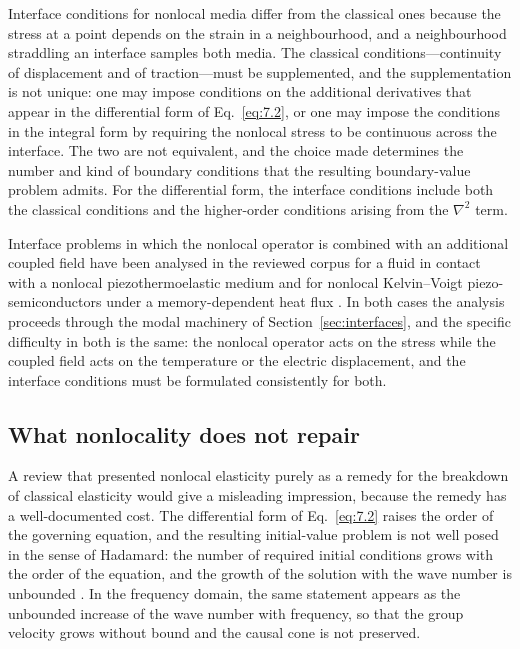 Interface conditions for nonlocal media differ from the classical ones because the stress at a point depends on the strain in a neighbourhood, and a neighbourhood straddling an interface samples both media. The classical conditions---continuity of displacement and of traction---must be supplemented, and the supplementation is not unique: one may impose conditions on the additional derivatives that appear in the differential form of Eq.~\eqref{eq:7.2}, or one may impose the conditions in the integral form by requiring the nonlocal stress to be continuous across the interface. The two are not equivalent, and the choice made determines the number and kind of boundary conditions that the resulting boundary-value problem admits. For the differential form, the interface conditions include both the classical conditions and the higher-order conditions arising from the $\nabla^2$ term.

Interface problems in which the nonlocal operator is combined with an additional coupled field have been analysed in the reviewed corpus for a fluid in contact with a nonlocal piezothermoelastic medium \cite{Gupta2023IJNMF} and for nonlocal Kelvin--Voigt piezo-semiconductors under a memory-dependent heat flux \cite{Gupta2026HeatMap}. In both cases the analysis proceeds through the modal machinery of Section~\ref{sec:interfaces}, and the specific difficulty in both is the same: the nonlocal operator acts on the stress while the coupled field acts on the temperature or the electric displacement, and the interface conditions must be formulated consistently for both.

\subsection{What nonlocality does not repair}
\label{sec:7.6}

A review that presented nonlocal elasticity purely as a remedy for the breakdown of classical elasticity would give a misleading impression, because the remedy has a well-documented cost. The differential form of Eq.~\eqref{eq:7.2} raises the order of the governing equation, and the resulting initial-value problem is not well posed in the sense of Hadamard: the number of required initial conditions grows with the order of the equation, and the growth of the solution with the wave number is unbounded \cite{Eringen1983}. In the frequency domain, the same statement appears as the unbounded increase of the wave number with frequency, so that the group velocity grows without bound and the causal cone is not preserved.

